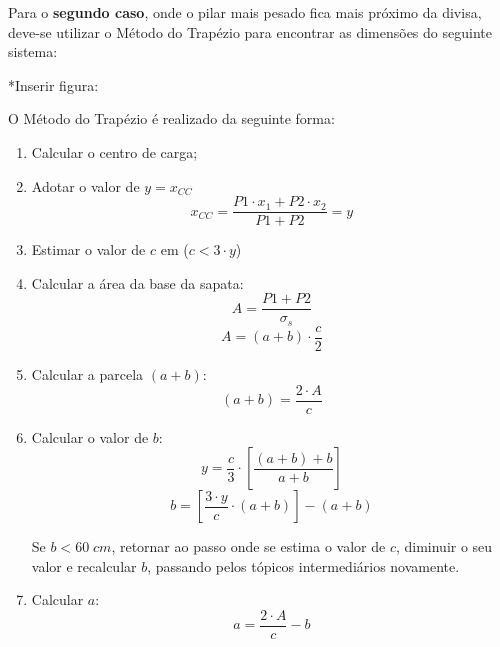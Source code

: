 Para o \textbf{segundo caso}, onde o pilar mais pesado fica mais próximo da divisa, deve-se utilizar o Método do Trapézio para encontrar as dimensões do seguinte sistema:

*Inserir figura:

O Método do Trapézio é realizado da seguinte forma:
\begin{enumerate}
	\item Calcular o centro de carga;
	\item Adotar o valor de $y=x_{CC}$
		\begin{equation}x_{CC}=\frac{P1\cdot x_1+P2\cdot x_2}{P1+P2}=y\end{equation}
	\item Estimar o valor de $c$ em ($c<3\cdot y$)
	\item Calcular a área da base da sapata:
		$$A=\frac{P1+P2}{\sigma_s}$$
		\begin{equation}A=(a+b)\cdot \frac{c}{2}\end{equation}
	\item Calcular a parcela $(a+b)$:
		\begin{equation}(a+b)=\frac{2\cdot A}{c}\end{equation}
	\item Calcular o valor de $b$:
		$$y=\frac{c}{3}\cdot\left[\frac{(a+b)+b}{a+b}\right]$$
		\begin{equation}b=\left[\frac{3\cdot y}{c}\cdot(a+b)\right]-(a+b)\end{equation}
	
	Se $b<60\;cm$, retornar ao passo onde se estima o valor de $c$, diminuir o seu valor e recalcular $b$, passando pelos tópicos intermediários novamente.
	\item Calcular $a$:
		\begin{equation}a=\frac{2\cdot A}{c}-b\end{equation}
\end{enumerate}